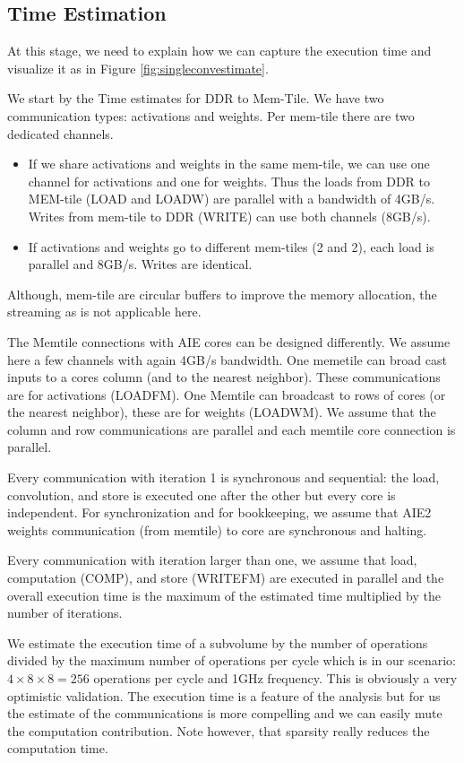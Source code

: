 \documentclass[sigconf]{acmart}
\begin{document}
\subsection{Time Estimation}
At this stage, we need to explain how we can capture the execution
time and visualize it as in Figure \ref{fig:singleconvestimate}. %

We start by the Time estimates for DDR to Mem-Tile. We have two
communication types: activations and weights. Per mem-tile there are
two dedicated channels.
\begin{itemize}
 \item If we share activations and weights in the same mem-tile, we
   can use one channel for activations and one for weights. Thus the
   loads from DDR to MEM-tile (LOAD and LOADW) are parallel with a
   bandwidth of 4GB/s. Writes from mem-tile to DDR (WRITE) can use
   both channels (8GB/s). 

 \item If activations and weights go to different mem-tiles (2 and 2),
   each load is parallel and 8GB/s. Writes
   are identical.
\end{itemize}
Although, mem-tile are circular buffers to improve the memory
allocation, the streaming as \cite{abs-2110-04327} is not applicable
here.
   

The Memtile connections with AIE cores can be designed differently. We
assume here a few channels with again 4GB/s bandwidth. One memetile
can broad cast inputs to a cores column (and to the nearest
neighbor). These communications are for activations (LOADFM). One
Memtile can broadcast to rows of cores (or the nearest neighbor),
these are for weights (LOADWM). We assume that the column and row
communications are parallel and each memtile core connection is
parallel.

Every communication with iteration 1 is synchronous and sequential:
the load, convolution, and store is executed one after the other but
every core is independent.  For synchronization and for bookkeeping,
we assume that AIE2 weights communication (from memtile) to core are
synchronous and halting.

Every communication with iteration larger than one, we assume that
load, computation (COMP), and store (WRITEFM) are executed in parallel
and the overall execution time is the maximum of the estimated time
multiplied by the number of iterations.

We estimate the execution time of a subvolume by the number of
operations divided by the maximum number of operations per cycle which
is in our scenario: $4\times 8 \times 8 = 256 $ operations per cycle
and 1GHz frequency. This is obviously a very optimistic
validation. The execution time is a feature of the analysis but for us
the estimate of the communications is more compelling and we can
easily mute the computation contribution. Note however, that sparsity
really reduces the computation time. 
\end{document}
